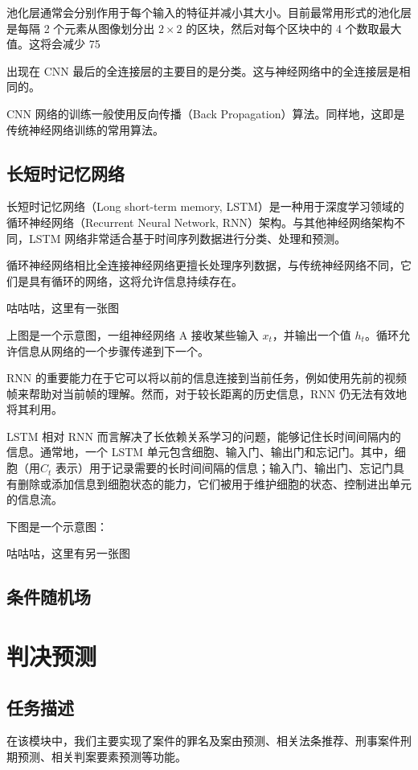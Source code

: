池化层通常会分别作用于每个输入的特征并减小其大小。目前最常用形式的池化层是每隔 2 个元素从图像划分出 ${\displaystyle 2\times 2}$ 的区块，然后对每个区块中的 4 个数取最大值。这将会减少 75%

出现在 CNN 最后的全连接层的主要目的是分类。这与神经网络中的全连接层是相同的。

CNN 网络的训练一般使用反向传播（Back Propagation）算法。同样地，这即是传统神经网络训练的常用算法。


\subsection{长短时记忆网络}

长短时记忆网络（Long short-term memory, LSTM）是一种用于深度学习领域的循环神经网络（Recurrent Neural Network, RNN）架构。与其他神经网络架构不同，LSTM 网络非常适合基于时间序列数据进行分类、处理和预测。

循环神经网络相比全连接神经网络更擅长处理序列数据，与传统神经网络不同，它们是具有循环的网络，这将允许信息持续存在。

咕咕咕，这里有一张图

上图是一个示意图，一组神经网络 A 接收某些输入 ${\displaystyle x_t}$，并输出一个值 ${\displaystyle h_t}$。循环允许信息从网络的一个步骤传递到下一个。

RNN 的重要能力在于它可以将以前的信息连接到当前任务，例如使用先前的视频帧来帮助对当前帧的理解。然而，对于较长距离的历史信息，RNN 仍无法有效地将其利用。

LSTM 相对 RNN 而言解决了长依赖关系学习的问题，能够记住长时间间隔内的信息。通常地，一个 LSTM 单元包含细胞、输入门、输出门和忘记门。其中，细胞（用${\displaystyle C_t}$ 表示）用于记录需要的长时间间隔的信息；输入门、输出门、忘记门具有删除或添加信息到细胞状态的能力，它们被用于维护细胞的状态、控制进出单元的信息流。

下图是一个示意图：

咕咕咕，这里有另一张图




\subsection{条件随机场}


\section{判决预测}
\subsection{任务描述}
在该模块中，我们主要实现了案件的罪名及案由预测、相关法条推荐、刑事案件刑期预测、相关判案要素预测等功能。

